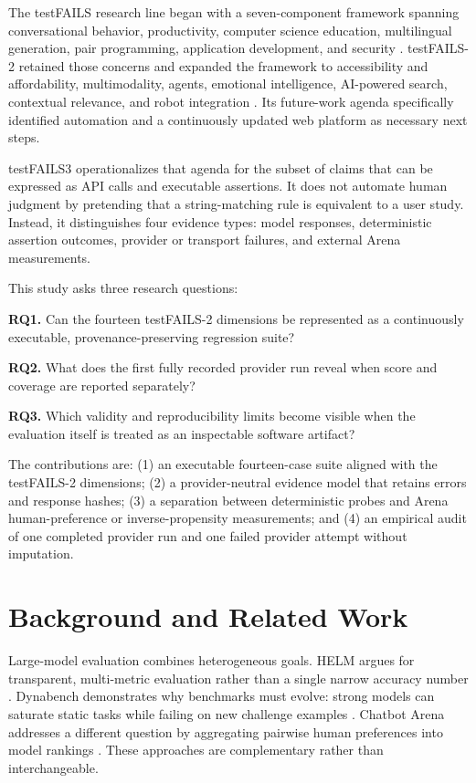 \documentclass[10pt,twocolumn]{article}
\newcommand{\system}{testFAILS3}
\begin{document}
The testFAILS research line began with a seven-component framework spanning conversational behavior, productivity, computer science education, multilingual generation, pair programming, application development, and security \cite{kumar2023testfails}. testFAILS-2 retained those concerns and expanded the framework to accessibility and affordability, multimodality, agents, emotional intelligence, AI-powered search, contextual relevance, and robot integration \cite{kumar2024testfails2}. Its future-work agenda specifically identified automation and a continuously updated web platform as necessary next steps.

\system{} operationalizes that agenda for the subset of claims that can be expressed as API calls and executable assertions. It does not automate human judgment by pretending that a string-matching rule is equivalent to a user study. Instead, it distinguishes four evidence types: model responses, deterministic assertion outcomes, provider or transport failures, and external Arena measurements.

This study asks three research questions:

\noindent\textbf{RQ1.} Can the fourteen testFAILS-2 dimensions be represented as a continuously executable, provenance-preserving regression suite?

\noindent\textbf{RQ2.} What does the first fully recorded provider run reveal when score and coverage are reported separately?

\noindent\textbf{RQ3.} Which validity and reproducibility limits become visible when the evaluation itself is treated as an inspectable software artifact?

The contributions are: (1) an executable fourteen-case suite aligned with the testFAILS-2 dimensions; (2) a provider-neutral evidence model that retains errors and response hashes; (3) a separation between deterministic probes and Arena human-preference or inverse-propensity measurements; and (4) an empirical audit of one completed provider run and one failed provider attempt without imputation.

\section{Background and Related Work}
Large-model evaluation combines heterogeneous goals. HELM argues for transparent, multi-metric evaluation rather than a single narrow accuracy number \cite{liang2022helm}. Dynabench demonstrates why benchmarks must evolve: strong models can saturate static tasks while failing on new challenge examples \cite{kiela2021dynabench}. Chatbot Arena addresses a different question by aggregating pairwise human preferences into model rankings \cite{chiang2024arena}. These approaches are complementary rather than interchangeable.
\end{document}
